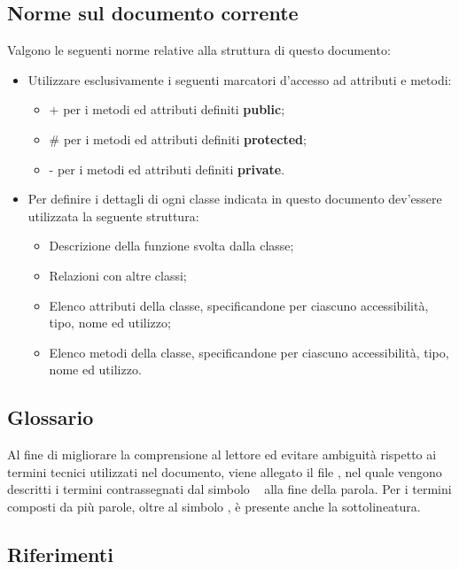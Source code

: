 {	\subsection{Norme sul documento corrente}{
		Valgono le seguenti norme relative alla struttura di questo documento:
		\begin{itemize}
			\item {Utilizzare esclusivamente i seguenti marcatori d'accesso ad attributi e metodi:
				\begin{itemize}
					\item + per i metodi ed attributi definiti \textbf{public};
					\item \# per i metodi ed attributi definiti \textbf{protected};
					\item - per i metodi ed attributi definiti \textbf{private}.
				\end{itemize}			
			}
			\item {Per definire i dettagli di ogni classe indicata in questo documento dev'essere utilizzata la seguente struttura:
				\begin{itemize}
					\item Descrizione della funzione svolta dalla classe;
					\item Relazioni con altre classi;
					\item Elenco attributi della classe, specificandone per ciascuno accessibilità, tipo, nome ed utilizzo;
					\item Elenco metodi della classe, specificandone per ciascuno accessibilità, tipo, nome ed utilizzo.
				\end{itemize}
			}
		\end{itemize}
		
	}
	
	
    \subsection{Glossario}{
	Al fine di migliorare la comprensione al lettore ed evitare ambiguità rispetto ai termini tecnici utilizzati nel documento, viene allegato il file
	\emph{\Glossario},  nel quale vengono descritti i termini contrassegnati dal simbolo \g~ alla fine della parola.
	Per i termini composti da più parole, oltre al simbolo \g, è presente anche la sottolineatura. 
    }

    \subsection{Riferimenti}{
}}
